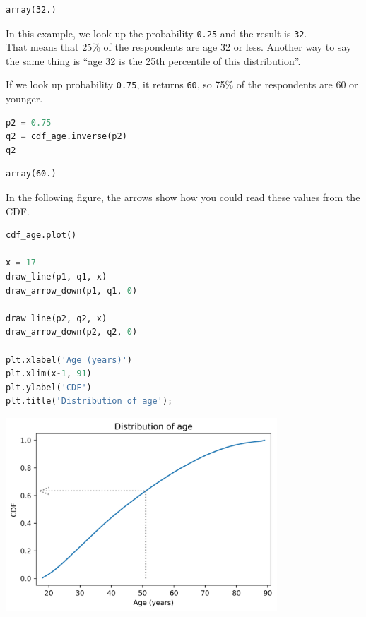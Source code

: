 \begin{lstlisting}[style=output]
array(32.)
\end{lstlisting}

In this example, we look up the probability
\passthrough{\lstinline!0.25!} and the result is
\passthrough{\lstinline!32!}.\\
That means that 25\% of the respondents are age 32 or less. Another way
to say the same thing is ``age 32 is the 25th percentile of this
distribution''.

If we look up probability \passthrough{\lstinline!0.75!}, it returns
\passthrough{\lstinline!60!}, so 75\% of the respondents are 60 or
younger.

\begin{lstlisting}[language=Python,style=source]
p2 = 0.75
q2 = cdf_age.inverse(p2)
q2
\end{lstlisting}

\begin{lstlisting}[style=output]
array(60.)
\end{lstlisting}

In the following figure, the arrows show how you could read these values
from the CDF.

\begin{lstlisting}[language=Python,style=source]
cdf_age.plot()

x = 17
draw_line(p1, q1, x)
draw_arrow_down(p1, q1, 0)

draw_line(p2, q2, x)
draw_arrow_down(p2, q2, 0)

plt.xlabel('Age (years)')
plt.xlim(x-1, 91)
plt.ylabel('CDF')
plt.title('Distribution of age');
\end{lstlisting}

\begin{center}
\includegraphics[width=4in]{chapters/08_distributions_files/08_distributions_72_0.png}
\end{center}

